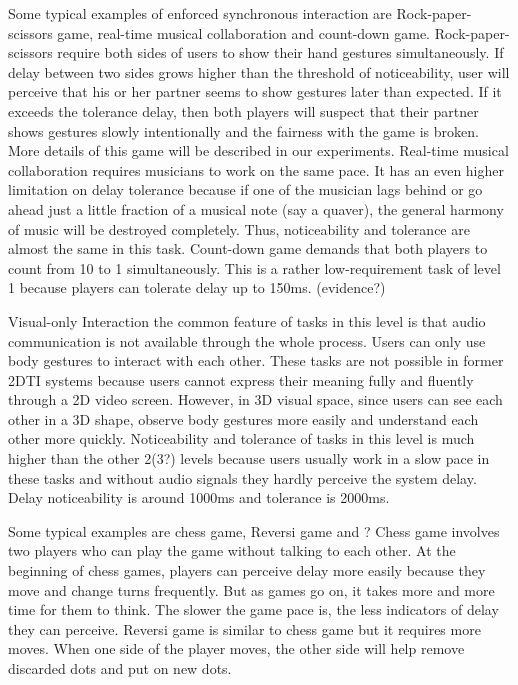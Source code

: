 Some typical examples of enforced synchronous interaction are Rock-paper-scissors game, real-time musical collaboration and count-down game. 
Rock-paper-scissors require both sides of users to show their hand gestures simultaneously. If delay between two sides grows higher than the threshold of noticeability, user will perceive that his or her partner seems to show gestures later than expected. If it exceeds the tolerance delay, then both players will suspect that their partner shows gestures slowly intentionally and the fairness with the game is broken. More details of this game will be described in our experiments.
Real-time musical collaboration requires musicians to work on the same pace. It has an even higher limitation on delay tolerance because if one of the musician lags behind or go ahead just a little fraction of a musical note (say a quaver), the general harmony of music will be destroyed completely. Thus, noticeability and tolerance are almost the same in this task.
Count-down game demands that both players to count from 10 to 1 simultaneously. This is a rather low-requirement task of level 1 because players can tolerate delay up to 150ms. (evidence?)

Visual-only Interaction the common feature of tasks in this level is that audio communication is not available through the whole process. Users can only use body gestures to interact with each other. These tasks are not possible in former 2DTI systems because users cannot express their meaning fully and fluently through a 2D video screen. However, in 3D visual space, since users can see each other in a 3D shape, observe body gestures more easily and understand each other more quickly. Noticeability and tolerance of tasks in this level is much higher than the other 2(3?) levels because users usually work in a slow pace in these tasks and without audio signals they hardly perceive the system delay. Delay noticeability is around 1000ms and tolerance is 2000ms.

Some typical examples are chess game, Reversi game and ?
Chess game involves two players who can play the game without talking to each other. At the beginning of chess games, players can perceive delay more easily because they move and change turns frequently. But as games go on, it takes more and more time for them to think. The slower the game pace is, the less indicators of delay they can perceive.
Reversi game is similar to chess game but it requires more moves. When one side of the player moves, the other side will help remove discarded dots and put on new dots. 



